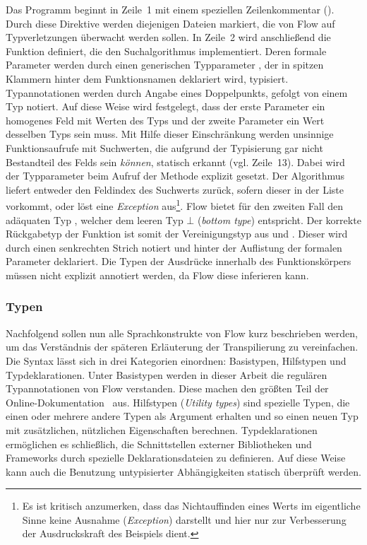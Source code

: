 Das Programm beginnt in Zeile~1 mit einem speziellen Zeilenkommentar (). Durch diese Direktive werden diejenigen Dateien markiert, die von Flow auf Typverletzungen überwacht werden sollen. In Zeile~2 wird anschließend die Funktion  definiert, die den Suchalgorithmus implementiert. Deren formale Parameter werden durch einen generischen Typparameter , der in spitzen Klammern hinter dem Funktionsnamen deklariert wird, typisiert. Typannotationen werden durch Angabe eines Doppelpunkts, gefolgt von einem Typ notiert. Auf diese Weise wird festgelegt, dass der erste Parameter  ein homogenes Feld mit Werten des Typs  und der zweite Parameter  ein Wert desselben Typs sein muss. Mit Hilfe dieser Einschränkung werden unsinnige Funktionsaufrufe mit Suchwerten, die aufgrund der Typisierung gar nicht Bestandteil des Felds sein \emph{können}, statisch erkannt (vgl. Zeile~13). Dabei wird der Typparameter  beim Aufruf der Methode explizit gesetzt.
Der Algorithmus liefert entweder den Feldindex des Suchwerts zurück, sofern dieser in der Liste vorkommt, oder löst eine \textit{Exception} aus\footnote{Es ist kritisch anzumerken, dass das Nichtauffinden eines Werts im eigentliche Sinne keine Ausnahme (\textit{Exception}) darstellt und hier nur zur Verbesserung der Ausdruckskraft des Beispiels dient.}. Flow bietet für den zweiten Fall den adäquaten Typ , welcher dem leeren Typ $\bot$ (\textit{bottom type}) entspricht. Der korrekte Rückgabetyp der Funktion ist somit der Vereinigungstyp aus  und . Dieser wird durch einen senkrechten Strich notiert und hinter der Auflistung der formalen Parameter deklariert. Die Typen der Ausdrücke innerhalb des Funktionskörpers müssen nicht explizit annotiert werden, da Flow diese inferieren kann.

\subsubsection{Typen}

Nachfolgend sollen nun alle Sprachkonstrukte von Flow kurz beschrieben werden, um das Verständnis der späteren Erläuterung der Transpilierung zu vereinfachen. Die Syntax lässt sich in drei Kategorien einordnen: Basistypen, Hilfstypen und Typdeklarationen.
Unter Basistypen werden in dieser Arbeit die regulären Typannotationen von Flow verstanden. Diese machen den größten Teil der Online-Dokumentation~\autocite{FLOW:TYPE_ANNOTATIONS} aus.
Hilfstypen (\textit{Utility types}) sind spezielle Typen, die einen oder mehrere andere Typen als Argument erhalten und so einen neuen Typ mit zusätzlichen, nützlichen Eigenschaften berechnen.
Typdeklarationen ermöglichen es schließlich, die Schnittstellen externer Bibliotheken und Frameworks durch spezielle Deklarationsdateien zu definieren. Auf diese Weise kann auch die Benutzung untypisierter Abhängigkeiten statisch überprüft werden.

